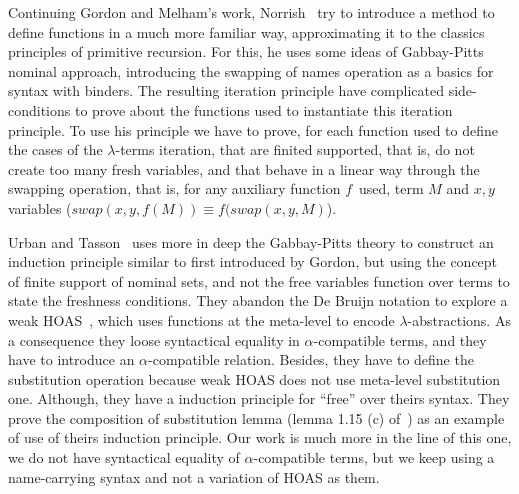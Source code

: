 \documentclass{entcs}
\newcommand{\alp}{\ensuremath{\alpha}}
\newcommand{\lamb}{\ensuremath{\lambda}}
\begin{document}
Continuing Gordon and Melham's work, Norrish~\cite{Norrish04recursivefunction} try to introduce a method to define functions in a much more familiar way, approximating it to the classics principles of primitive recursion. For this, he uses some ideas of Gabbay-Pitts nominal approach, introducing the swapping of names operation as a basics for syntax with binders. The resulting iteration principle have complicated side-conditions to prove about the functions used to instantiate this iteration principle. To use his principle we have to prove, for each function used to define the cases of the \lamb-terms iteration, that are finited supported, that is, do not create too many fresh variables, and that behave in a linear way through the swapping operation, that is, for any auxiliary function $f$\ used, term $M$ and $x , y$ variables ($swap(x,y,f(M)) \equiv f(swap(x,y,M)$).

Urban and Tasson~\cite{urban05} uses more in deep the Gabbay-Pitts theory to construct an induction principle similar to first introduced by Gordon, but using the concept of finite support of nominal sets, and not the free variables function over terms to state the freshness conditions. They abandon the De Bruijn notation to explore a weak HOAS~\cite{DespeyrouxFH95}, which uses functions at the meta-level to encode \lamb-abstractions. As a consequence they loose syntactical equality in \alp-compatible terms, and they have to introduce an \alp-compatible relation. Besides, they have to define the substitution operation because weak HOAS does not use meta-level substitution one. Although, they have a induction principle for ``free'' over theirs syntax. They prove the composition of substitution lemma (lemma 1.15 (c) of~\cite{DBLP:books/cu/HindleyS86}) as an example of use of theirs induction principle. Our work is much more in the line of this one, we do not have syntactical equality of \alp-compatible terms, but we keep using a name-carrying syntax and not a variation of HOAS as them.




\end{document}

